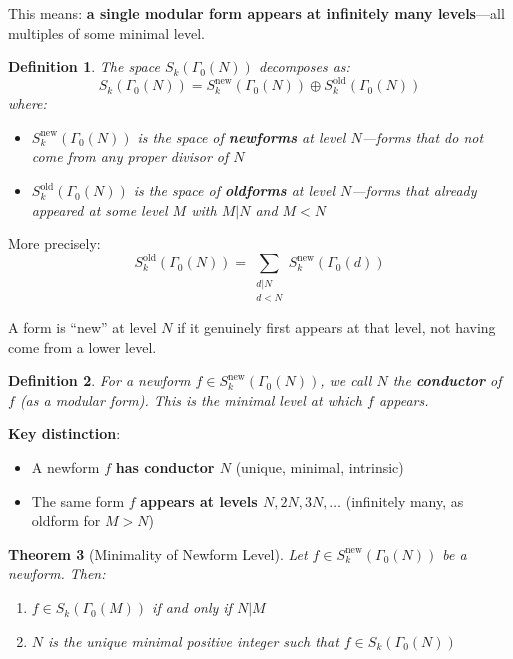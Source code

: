 \documentclass[11pt]{article}
\newtheorem{theorem}{Theorem}
\newtheorem{definition}[theorem]{Definition}
\begin{document}
This means: \textbf{a single modular form appears at infinitely many levels}---all multiples of some minimal level.

\begin{definition}
The space $S_k(\Gamma_0(N))$ decomposes as:
$$S_k(\Gamma_0(N)) = S_k^{\text{new}}(\Gamma_0(N)) \oplus S_k^{\text{old}}(\Gamma_0(N))$$
where:
\begin{itemize}
\item $S_k^{\text{new}}(\Gamma_0(N))$ is the space of \textbf{newforms} at level $N$---forms that do \emph{not} come from any proper divisor of $N$
\item $S_k^{\text{old}}(\Gamma_0(N))$ is the space of \textbf{oldforms} at level $N$---forms that already appeared at some level $M$ with $M | N$ and $M < N$
\end{itemize}
\end{definition}

More precisely:
$$S_k^{\text{old}}(\Gamma_0(N)) = \sum_{\substack{d | N \\ d < N}} S_k^{\text{new}}(\Gamma_0(d))$$

A form is ``new'' at level $N$ if it genuinely first appears at that level, not having come from a lower level.

\begin{definition}
For a newform $f \in S_k^{\text{new}}(\Gamma_0(N))$, we call $N$ the \textbf{conductor} of $f$ (as a modular form). This is the minimal level at which $f$ appears.
\end{definition}

\textbf{Key distinction}:
\begin{itemize}
\item A newform $f$ \textbf{has conductor $N$} (unique, minimal, intrinsic)
\item The same form $f$ \textbf{appears at levels $N, 2N, 3N, \ldots$} (infinitely many, as oldform for $M > N$)
\end{itemize}

\begin{theorem}[Minimality of Newform Level]
Let $f \in S_k^{\text{new}}(\Gamma_0(N))$ be a newform. Then:
\begin{enumerate}
\item $f \in S_k(\Gamma_0(M))$ if and only if $N | M$
\item $N$ is the unique minimal positive integer such that $f \in S_k(\Gamma_0(N))$
\end{enumerate}
\end{theorem}
\end{document}
